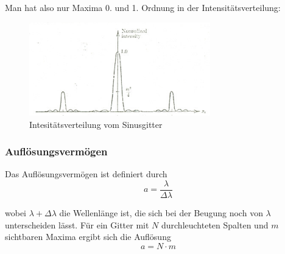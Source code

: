 \begin{enumerate}
Man hat also nur Maxima 0. und 1. Ordnung in der Intensit\"atsverteilung:

\begin{figure}[H]
	\centering \includegraphics[width=0.7\textwidth]{Bilder/Sinusverteilung.jpg}
	\caption{Intesit\"atsverteilung vom Sinusgitter}
\end{figure}
\end{enumerate}

\subsubsection{Aufl\"osungsverm\"ogen}

Das Aufl\"osungsverm\"ogen ist definiert durch $$a=\frac{\lambda}{\Delta \lambda}$$

wobei $\lambda +\Delta \lambda$ die Wellenl\"ange ist, die sich bei der Beugung noch von $\lambda$ unterscheiden l\"asst. F\"ur ein Gitter mit $N$ durchleuchteten Spalten und $m$ sichtbaren Maxima ergibt sich die Aufl\"osung $$a=N\cdot m$$




































